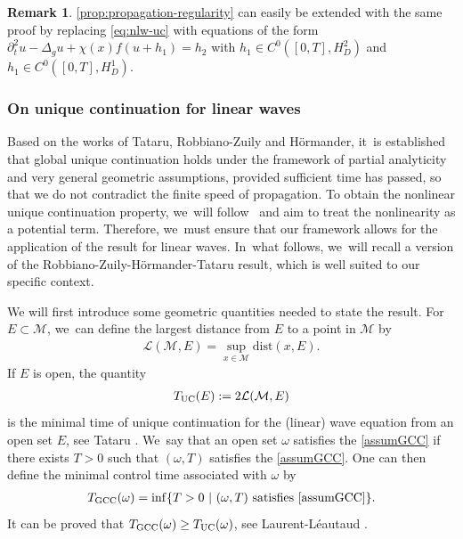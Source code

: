 \documentclass[JEP,XML,SOM,Unicode,published]{cedram}
\theoremstyle{definition}
\newtheorem{remark}[theorem]{Remark}
\let\mc\mathcal
\newcommand{\M}{\mc{M}}
\begin{document}
\begin{remark}
\label{rk:propagsource}
\cref{prop:propagation-regularity} can easily be extended with the same proof by replacing \eqref{eq:nlw-uc} with equations of the form $\partial_t^2 u-\Delta_g u+\chi(x)f(u+h_1)=h_2$ with $h_1\in C^0([0,T],H^2_D)$ and $h_1\in C^0([0,T],H^1_D)$.
\end{remark}

\subsubsection{On unique continuation for linear waves}\label{s:UCPword} Based on the works of Tataru, Robbiano-Zuily and Hörmander, it~is established that global unique continuation holds under the framework of partial analyticity and very general geometric assumptions, provided sufficient time has passed, so that we do not contradict the finite speed of propagation. To obtain the nonlinear unique continuation property, we~will follow~\cite{JL13} and aim to treat the nonlinearity as a potential term. Therefore, we~must ensure that our framework allows for the application of the result for linear waves. In~what follows, we~will recall a version of the Robbiano-Zuily-Hörmander-Tataru result, which is well suited to our specific context.

We will first introduce some geometric quantities needed to state the result. For $E\subset \M$, we~can define the largest distance from $E$ to a point in $\M$ by\vspace*{-3pt}
\begin{align*}
\mc{L}(\M, E)=\sup_{x\in\M}\text{dist}(x, E).
\end{align*}
If $E$ is open, the quantity\vspace*{-3pt}
\begin{align*}
T_{\textup{UC}}(E):=2\mc{L}(\M, E)
\end{align*}
is the minimal time of unique continuation for the (linear) wave equation from an open set $E$, see Tataru \cite{Tat95}. We~say that an open set $\omega$ satisfies the \ref{assumGCC} if there exists $T>0$ such that $(\omega, T)$ satisfies the \ref{assumGCC}. One can then define the minimal control time associated with $\omega$ by\vspace*{-3pt}
\begin{align*}
T_{\textup{GCC}}(\omega)=\inf\{T>0\ |\ (\omega, T)\ \text{satisfies \ref{assumGCC}}\}.
\end{align*}
It can be proved that $T_{\textup{GCC}}(\omega)\geq T_{\textup{UC}}(\omega)$, see Laurent-Léautaud \cite[Lem.\,B.4]{LL16}.
\end{document}
